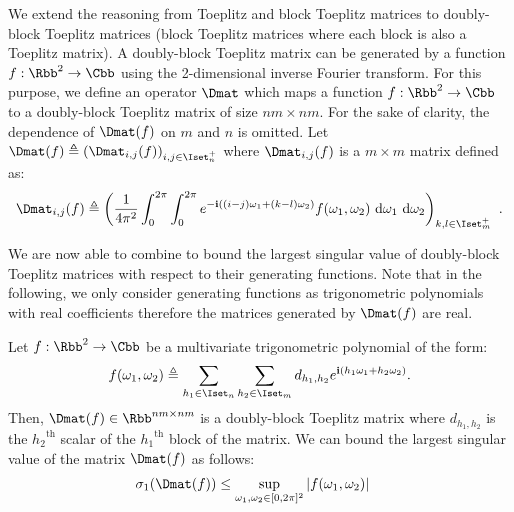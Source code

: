 We extend the reasoning from Toeplitz and block Toeplitz matrices to doubly-block Toeplitz matrices (\ie block Toeplitz matrices where each block is also a Toeplitz matrix).
A doubly-block Toeplitz matrix can be generated by a function $f: \Rbb^2 \rightarrow \Cbb$ using the 2-dimensional inverse Fourier transform.
For this purpose, we define an operator $\Dmat$ which maps a function $f: \Rbb^2 \rightarrow \Cbb$ to a doubly-block Toeplitz matrix of size $nm \times nm$.
For the sake of clarity, the dependence of $\Dmat(f)$ on $m$ and $n$ is omitted.
Let $\Dmat(f) \triangleq \leftmat \Dmat_{i,j}(f)\rightmat_{i,j \in \Iset^+_n}$ where $\Dmat_{i,j}(f)$ is a $m \times m$ matrix defined as:
\begin{equation} \label{equation:doubly_block_toeplitz_operator}
  \Dmat_{i,j}(f) \triangleq \leftmat \frac{1}{4\pi^{2}} \int_{0}^{2\pi} \int_{0}^{2\pi} e^{- \ci \left((i-j)\omega_{1}+(k-l)\omega_{2}\right)}f(\omega_{1},\omega_{2}) \,\diff \omega_{1} \,\diff \omega_{2} \rightmat_{k,l \in \Iset^+_m} \enspace.
\end{equation}

We are now able to combine  to bound the largest singular value of doubly-block Toeplitz matrices with respect to their generating functions. 
Note that in the following, we only consider generating functions as trigonometric polynomials with real coefficients therefore the matrices generated by $\Dmat(f)$ are real.

\begin{maintheorem} \label{theorem:doubly_block_teoplitz_sup_singular}
  Let $f: \Rbb^2 \rightarrow \Cbb$ be a multivariate trigonometric polynomial of the form:
  \begin{equation}\label{equation:muli_variate_poly_on_M}
    f(\omega_1, \omega_2) \triangleq \sum_{h_1 \in \Iset_n} \sum_{h_2 \in \Iset_m} d_{h_1, h_2} e^{\ci (h_1 \omega_1 + h_2 \omega_2)}.
  \end{equation}
  Then, $\Dmat(f) \in \Rbb^{nm \times nm}$ is a doubly-block Toeplitz matrix where $d_{h_{1},h_{2}}$ is the ${h_2}^\textrm{th}$ scalar of the ${h_1}^\textrm{th}$ block of the matrix.
  We can bound the largest singular value of the matrix $\Dmat(f)$ as follows:
  \begin{align}
    \sigma_{1} \left( \Dmat(f) \right) &\leq \sup_{\omega_1, \omega_2 \in [0, 2\pi]^2}|f(\omega_1,\omega_2)|
  \end{align}
  \removespace
\end{maintheorem}


